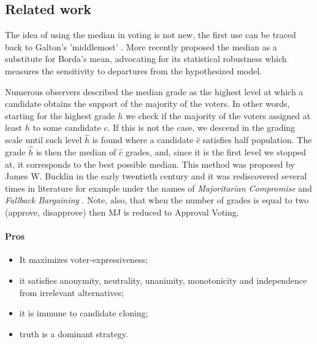\documentclass[version=3.21, pagesize, twoside=off, bibliography=totoc, DIV=calc, fontsize=12pt, a4paper]{scrartcl}
\begin{document}
\subsection{Related work}
The idea of using the median in voting is not new, the first use can be traced back to Galton's 'middlemost' \citep{Galton1907a,Galton1907b}. More recently \citet{Bassett1999} proposed the median as a substitute for Borda's mean, advocating for its statistical robustness \textemdash which measures the sensitivity to departures from the hypothesized model.

Numerous observers described the median grade as the highest level at which a candidate obtains the support of the majority of the voters. In other words, starting for the highest grade $h$ we check if the majority of the voters assigned at least $h$ to some candidate $c$. If this is not the case, we descend in the grading scale until such level $\hat{h}$ is found where a candidate $\hat{c}$ satisfies half population. The grade $\hat{h}$ is then the median of $\hat{c}$ grades, and, since it is the first level we stopped at, it corresponds to the best possible median. This method was proposed by James W. Bucklin in the early twentieth century \citep{Hoag1926} and it was rediscovered several times in literature for example under the names of \textit{Majoritarian Compromise} \citep{Sertel1986,Sertel1999} and \textit{Fallback Bargaining} \citep{Brams2001}. Note, also, that when the number of grades is equal to two (approve, disapprove) then \acs{MJ} is reduced to Approval Voting.

\paragraph{Pros}
\begin{itemize}
	\item It maximizes voter-expressiveness;
	\item it satisfies anonymity, neutrality, unanimity, monotonicity and independence from irrelevant alternatives;
	\item it is immune to candidate cloning;
	\item truth is a dominant strategy.
\end{itemize}
\end{document}
